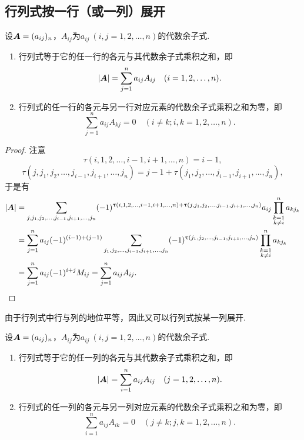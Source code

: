 \subsection{行列式按一行（或一列）展开}
\begin{theorem}
设\(\boldsymbol{A}=(a_{ij})_n\)，\(A_{ij}\)为\(a_{ij}\ (i,j=1,2,\dotsc,n)\)的代数余子式.
\begin{enumerate}
	\item 行列式等于它的任一行的各元与其代数余子式乘积之和，即\begin{equation}
		\abs{\boldsymbol{A}} = \sum\limits_{j=1}^n a_{ij} A_{ij}
		\quad(i=1,2,\dotsc,n).
	\end{equation}

	\item 行列式的任一行的各元与另一行对应元素的代数余子式乘积之和为零，即\begin{equation}
		\sum\limits_{j=1}^n a_{ij} A_{kj} = 0
		\quad(i \neq k;
		i,k=1,2,\dotsc,n).
	\end{equation}
\end{enumerate}
\begin{proof}
注意\[
\tau(i,1,2,\dotsc,i-1,i+1,\dotsc,n) = i-1,
\]\[
\tau(j,j_1,j_2,\dotsc,j_{i-1},j_{i+1},\dotsc,j_n) = j-1+\tau(j_1,j_2,\dotsc,j_{i-1},j_{i+1},\dotsc,j_n),
\]于是有\begin{align*}
	\abs{\boldsymbol{A}}
	&= \sum\limits_{j,j_1,j_2,\dotsc,j_{i-1},j_{i+1},\dotsc,j_n}
		(-1)^{\uptau(i,1,2,\dotsc,i-1,i+1,\dotsc,n) + \uptau(j,j_1,j_2,\dotsc,j_{i-1},j_{i+1},\dotsc,j_n)}
		a_{ij} \prod\limits_{\substack{k=1 \\ k \neq i}}^n a_{k j_k} \\
	&= \sum\limits_{j=1}^n a_{ij} (-1)^{(i-1)+(j-1)}
		\sum\limits_{j_1,j_2,\dotsc,j_{i-1},j_{i+1},\dotsc,j_n}
			(-1)^{\uptau(j_1,j_2,\dotsc,j_{i-1},j_{i+1},\dotsc,j_n)}
				\prod\limits_{\substack{k=1 \\ k \neq i}}^n a_{k j_k} \\
	&= \sum\limits_{j=1}^n a_{ij} (-1)^{i+j} M_{ij}
	= \sum\limits_{j=1}^n a_{ij} A_{ij}.
	\qedhere
\end{align*}
\end{proof}
\end{theorem}

由于行列式中行与列的地位平等，因此又可以行列式按某一列展开.
\begin{theorem}
设\(\boldsymbol{A}=(a_{ij})_n\)，\(A_{ij}\)为\(a_{ij}\ (i,j=1,2,\dotsc,n)\)的代数余子式.
\begin{enumerate}
	\item 行列式等于它的任一列的各元与其代数余子式乘积之和，即\begin{equation}
		\abs{\boldsymbol{A}} = \sum\limits_{i=1}^n a_{ij} A_{ij}
		\quad(j=1,2,\dotsc,n).
	\end{equation}

	\item 行列式的任一列的各元与另一列对应元素的代数余子式乘积之和为零，即\begin{equation}
		\sum\limits_{i=1}^n a_{ij} A_{ik} = 0
		\quad(j \neq k;
		j,k=1,2,\dotsc,n).
	\end{equation}
\end{enumerate}
\end{theorem}

